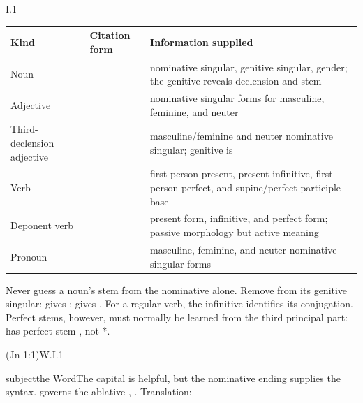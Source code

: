 \begin{courseunit}{I.1}
\begin{center}\small
\begin{tabularx}{\linewidth}{@{}P{1.22in}P{2.15in}Y@{}}
\toprule
\textbf{Kind} & \textbf{Citation form} & \textbf{Information supplied} \\
\midrule
Noun &  & nominative singular, genitive singular,
gender; the genitive reveals declension and stem \\
Adjective &  & nominative singular forms for
masculine, feminine, and neuter \\
Third-declension adjective &  & masculine/feminine and
neuter nominative singular; genitive is  \\
Verb &  & first-person present,
present infinitive, first-person perfect, and supine/perfect-participle base \\
Deponent verb &  & present form, infinitive,
and perfect form; passive morphology but active meaning \\
Pronoun &  & masculine, feminine, and neuter nominative
singular forms \\
\bottomrule
\end{tabularx}
\end{center}

Never guess a noun's stem from the nominative alone. Remove  from
its genitive singular:  gives ; 
gives . For a regular verb, the infinitive identifies its
conjugation. Perfect stems, however, must normally be learned from the third
principal part:  has perfect stem , not
*.

\begin{workedexample}{ (Jn 1:1)}{W.I.1}
\par\medskip
{}
{subject}{the Word}{The capital is helpful, but the nominative ending supplies
the syntax.}
 governs the ablative , .
Translation: 
\end{workedexample}


\end{courseunit}
